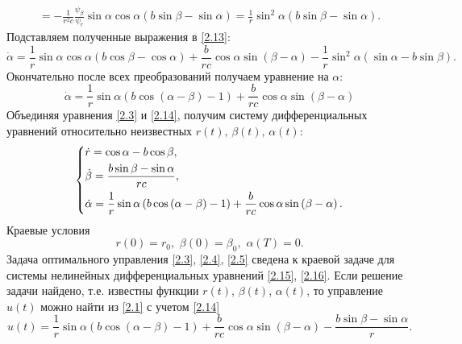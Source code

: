 \documentclass[a4paper,12pt, openany]{book}
\theoremstyle{plain} %
\theoremstyle{definition} %
\theoremstyle{remark} %
\numberwithin{equation}{chapter}
\begin{document}
{\begin{multline*}
 =  - \frac{1}{{r^2 c}}\frac{{\psi _\beta  }}{{\psi _r }}\sin \alpha \cos \alpha \left( {b\sin \beta  - \sin \alpha } \right) = \frac{1}{r}\sin ^2 \alpha \left( {b\sin \beta  - \sin \alpha } \right). 
\end{multline*}
Подставляем полученные выражения в \eqref{2.13}:
\begin{equation*}
\dot \alpha  = \frac{1}{r}\sin \alpha \cos \alpha \left( {b\cos \beta  - \cos \alpha } \right) + \frac{b}{{rc}}
\cos \alpha \sin \left( {\beta  - \alpha } \right) - \frac{1}{r}\sin ^2 \alpha \left( {\sin \alpha  - b\sin \beta } \right).
\end{equation*}
Окончательно после всех преобразований получаем уравнение на $\alpha$:
\begin{equation}\label{2.14}
\dot \alpha  = \frac{1}{r}\sin \alpha \left( {b\cos \left( {\alpha  - \beta } \right) - 1} \right) + \frac{b}{{rc}}\cos \alpha \sin \left( {\beta  - \alpha } \right)
\end{equation}
Объединяя уравнения \eqref{2.3} и \eqref{2.14}, получим систему дифференциальных уравнений относительно неизвестных $r(t), \, \beta(t), \, \alpha(t)$: 
\begin{equation}\label{2.15}
\left\{ {\begin{aligned}
   &\dot r = \cos \alpha  - b\cos \beta , \hfill  \\
   &\dot \beta  = \frac{{b\sin \beta  - \sin \alpha }}{{rc}}, \hfill  \\
   &\dot \alpha  = \frac{1}{r}\sin \alpha \left( {b\cos \left( {\alpha  - \beta } \right) - 1} \right) + \frac{b}{{rc}}\cos \alpha \sin \left( {\beta  - \alpha } \right). \hfill  \\
\end{aligned}} \right.
\end{equation}
Краевые условия
\begin{equation}\label{2.16}
r\left( 0 \right) = r_0 ,\,\,\beta  \left( 0 \right) = \beta _0 ,\,\,\alpha \left( T \right) = 0.
\end{equation}
\newpage
Задача оптимального управления \eqref{2.3}, \eqref{2.4}, \eqref{2.5} сведена к краевой задаче для системы нелинейных дифференциальных уравнений \eqref{2.15}, \eqref{2.16}. Если решение задачи найдено, т.е. известны функции $r(t)$, $\beta(t)$, $\alpha(t)$, то управление $u(t)$ можно найти из \eqref{2.1} с учетом \eqref{2.14}
\begin{equation}\label{2.17}
u\left( t \right) = \frac{1}{r}\sin \alpha \left( {b\cos \left( {\alpha  - \beta } \right) - 1} \right) + \frac{b}{{rc}}\cos \alpha \sin \left( {\beta  - \alpha } \right) - \frac{{b\sin \beta  - \sin \alpha }}{r}.
\end{equation}


}
\end{document}
